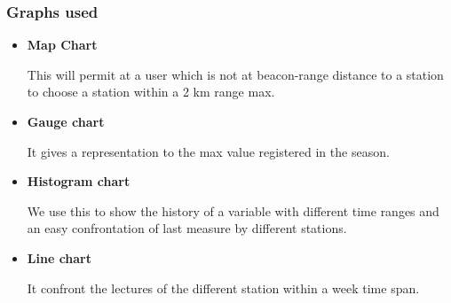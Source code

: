 \documentclass[12pt]{article} %
\begin{document}
\subsubsection{Graphs used}
\begin{itemize}
\item \textbf{Map Chart}

This will permit at a user which is not at beacon-range distance to a station to choose a station within a 2 km range max. 

\item \textbf{Gauge chart}

It gives a representation to the max value registered in the season.

\item \textbf{Histogram chart}

We use this to show the history of a variable with different time ranges and an easy confrontation of last measure by different stations.

\item \textbf{Line chart}

It confront the lectures of the different station within a week time span.
\end{itemize}
\end{document}
